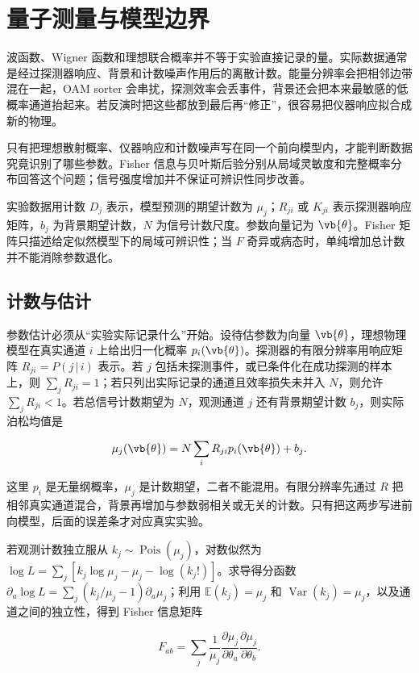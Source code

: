 \chapter{量子测量与模型边界}

波函数、Wigner 函数和理想联合概率并不等于实验直接记录的量。实际数据通常是经过探测器响应、背景和计数噪声作用后的离散计数。能量分辨率会把相邻边带混在一起，OAM sorter 会串扰，探测效率会丢事件，背景还会把本来最敏感的低概率通道抬起来。若反演时把这些都放到最后再“修正”，很容易把仪器响应拟合成新的物理。

只有把理想散射概率、仪器响应和计数噪声写在同一个前向模型内，才能判断数据究竟识别了哪些参数。Fisher 信息与贝叶斯后验分别从局域灵敏度和完整概率分布回答这个问题；信号强度增加并不保证可辨识性同步改善。

实验数据用计数 $D_j$ 表示，模型预测的期望计数为 $\mu_j$；$R_{ji}$ 或 $K_{ji}$ 表示探测器响应矩阵，$b_j$ 为背景期望计数，$N$ 为信号计数尺度。参数向量记为 $\vb{\theta}$。Fisher 矩阵只描述给定似然模型下的局域可辨识性；当 $F$ 奇异或病态时，单纯增加总计数并不能消除参数退化。


\section{计数与估计}
参数估计必须从“实验实际记录什么”开始。设待估参数为向量 $\vb{\theta}$，理想物理模型在真实通道 $i$ 上给出归一化概率 $p_i(\vb{\theta})$。探测器的有限分辨率用响应矩阵 $R_{ji}=P(j\,|\,i)$ 表示。若 $j$ 包括未探测事件，或已条件化在成功探测的样本上，则 $\sum_jR_{ji}=1$；若只列出实际记录的通道且效率损失未并入 $N$，则允许 $\sum_jR_{ji}<1$。若总信号计数期望为 $N$，观测通道 $j$ 还有背景期望计数 $b_j$，则实际泊松均值是

\begin{equation}
\mu_j(\vb{\theta})=N\sum_iR_{ji}p_i(\vb{\theta})+b_j.
\label{eq:ch07-1}
\end{equation}

这里 $p_i$ 是无量纲概率，$\mu_j$ 是计数期望，二者不能混用。有限分辨率先通过 $R$ 把相邻真实通道混合，背景再增加与参数弱相关或无关的计数。只有把这两步写进前向模型，后面的误差条才对应真实实验。

若观测计数独立服从 $k_j\sim\operatorname{Pois}(\mu_j)$，对数似然为 $\log L=\sum_j[k_j\log\mu_j-\mu_j-\log(k_j!)]$。求导得分函数 $\partial_a\log L=\sum_j(k_j/\mu_j-1)\partial_a\mu_j$；利用 $\mathbb E(k_j)=\mu_j$ 和 $\operatorname{Var}(k_j)=\mu_j$，以及通道之间的独立性，得到 Fisher 信息矩阵

\begin{equation}
F_{ab}=\sum_j\frac{1}{\mu_j}\frac{\partial\mu_j}{\partial\theta_a}\frac{\partial\mu_j}{\partial\theta_b}.
\label{eq:ch07-2}
\end{equation}

